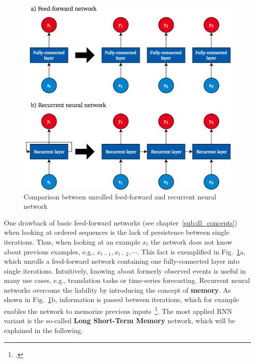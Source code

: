 \begin{figure}[h]
  \centering
  \includegraphics[height=10cm]{img/rnn_unrolled_2}
  \caption{Comparison between unrolled feed-forward and recurrent neural network}
\label{fig:rnn_unrolled}
\end{figure}

One drawback of basic feed-forward networks (see chapter~\ref{sub:dl_concepts})
when looking at ordered sequences is the lack of persistence between single
iterations.
Thus, when looking at an example $x_t$ the network does not know about previous
examples, e.g., $x_{t-1}, x_{t-2},\cdots$.
This fact is exemplified in Fig.~\ref{fig:rnn_unrolled}a, which unrolls a
feed-forward network containing one fully-connected layer into single iterations.
Intuitively, knowing about formerly observed events is useful in many use cases,
e.g., translation tasks or time-series forecasting.
Recurrent neural networks overcome the liability by introducing the concept
of \textbf{memory}.
As shown in Fig.~\ref{fig:rnn_unrolled}b, information is passed between
iterations, which for example enables the network to memorize previous inputs~\footcite{Goodfellow2016}.
The most applied RNN variant is the so-called \textbf{Long Short-Term Memory}
network, which will be explained in the following.

